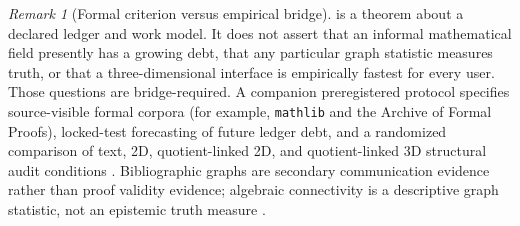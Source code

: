 \documentclass[11pt]{article}
\theoremstyle{plain}
\theoremstyle{definition}
\theoremstyle{remark}
\newtheorem{remark}[theorem]{Remark}
\begin{document}
\begin{remark}[Formal criterion versus empirical bridge]
\label{rem:protocol-v10}
 is a theorem about a declared ledger and
work model.  It does not assert that an informal mathematical field presently
has a growing debt, that any particular graph statistic measures truth, or that
a three-dimensional interface is empirically fastest for every user.  Those
questions are bridge-required.  A companion preregistered protocol specifies
source-visible formal corpora (for example, \texttt{mathlib} and the Archive of
Formal Proofs), locked-test forecasting of future ledger debt, and a randomized
comparison of text, 2D, quotient-linked 2D, and quotient-linked 3D structural
audit conditions \cite{mathlib2020,vanDoorn2020,blanchette2015,huch2024,nosek2018}.
Bibliographic graphs are secondary communication evidence rather than proof
validity evidence; algebraic connectivity is a descriptive graph statistic, not
an epistemic truth measure \cite{fiedler1973,chung1997}.
\end{remark}
\end{document}

